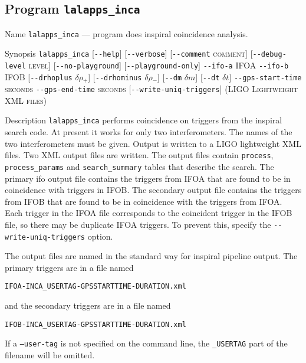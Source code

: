 \subsection{Program \texttt{lalapps\_inca}}
\label{program:lalapps-inca}

\begin{entry}
\item[Name]
\verb$lalapps_inca$ --- program does inspiral coincidence analysis.

\item[Synopsis]
\verb$lalapps_inca$ 
[\verb$--help$]
[\verb$--verbose$]
[\verb$--comment$ \textsc{comment}]
[\verb$--debug-level$ \textsc{level}] \newline
%
[\verb$--no-playground$]
[\verb$--playground-only$]
\verb$--ifo-a$ \textsc{IFOA} 
\verb$--ifo-b$ \textsc{IFOB} \newline
%
[\verb$--drhoplus$ \textsc{$\delta\rho_{+}$}]
[\verb$--drhominus$ \textsc{$\delta\rho_{-}$}]
[\verb$--dm$ \textsc{$\delta m$}]
[\verb$--dt$ \textsc{$\delta t$}] \newline
%
\verb$--gps-start-time$ \textsc{seconds} 
\verb$--gps-end-time$ \textsc{seconds} 
[\verb$--write-uniq-triggers$] \newline
%
\textsc{(LIGO Lightweight XML files)}

\item[Description] 
\verb$lalapps_inca$ performs coincidence on triggers from the inspiral
search code.  At present it works for only two interferometers. The names
of the two interferometers must be given. Output is written to a LIGO
lightweight XML files. Two XML output files are written.  The output files
contain \texttt{process}, \texttt{process\_params} and
\texttt{search\_summary} tables that describe the search. The primary ifo
output file contains the triggers from \textsc{IFOA} that are found to be in
coincidence with triggers in \textsc{IFOB}. The secondary output file contains
the triggers from \textsc{IFOB} that are found to be in coincidence with the
triggers from \textsc{IFOA}.  Each trigger in the \textsc{IFOA} file
corresponds to the coincident trigger in the \textsc{IFOB} file, so there may
be duplicate  \textsc{IFOA} triggers.  To prevent this, specify the
\verb$--write-uniq-triggers$ option.

The output files are named in the standard way for inspiral pipeline output.
The primary triggers are in a file named\\
\begin{center}
\texttt{IFOA-INCA\_USERTAG-GPSSTARTTIME-DURATION.xml}\\
\end{center}
and the secondary triggers are in a file named\\
\begin{center}
\texttt{IFOB-INCA\_USERTAG-GPSSTARTTIME-DURATION.xml}\\
\end{center}
If a \texttt{--user-tag} is not specified on the command line, the
\texttt{\_USERTAG} part of the filename will be omitted.


\end{entry}
